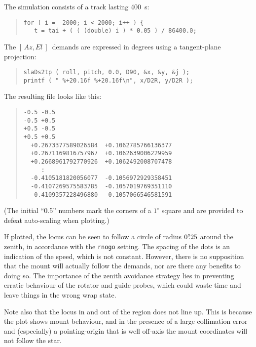\documentclass[12pt,fleqn,twoside]{article}
\renewcommand{\_}{{\tt\char'137}}     %
\newcommand{\azel}      {$[\,Az,El~]$}
\newcommand{\degree}[2] {$#1^{\circ}
                        \hspace{-0.35em}.\hspace{0.04em}#2$}
\begin{document}
The simulation consists of a track lasting 400~s:
\begin{quote}
\begin{small}
\begin{verbatim}
for ( i = -2000; i < 2000; i++ ) {
   t = tai + ( ( (double) i ) * 0.05 ) / 86400.0;
\end{verbatim}\end{small}
\end{quote}
The \azel\ demands are expressed in degrees using a tangent-plane
projection:
\begin{quote}
\begin{small}
\begin{verbatim}
slaDs2tp ( roll, pitch, 0.0, D90, &x, &y, &j );
printf ( " %+20.16f %+20.16f\n", x/D2R, y/D2R );
\end{verbatim}\end{small}
\end{quote}
The resulting file looks like this:
\begin{quote}
\begin{small}
\begin{verbatim}
-0.5 -0.5
-0.5 +0.5
+0.5 -0.5
+0.5 +0.5
  +0.2673377589026584  +0.1062785766136377
  +0.2671169816757967  +0.1062639006229959
  +0.2668961792770926  +0.1062492008707478
     :
  -0.4105181820056077  -0.1056972929358451
  -0.4107269575583785  -0.1057019769351110
  -0.4109357228496880  -0.1057066546581591
\end{verbatim}\end{small}
\end{quote}
(The initial ``0.5'' numbers mark the corners of a $1^\circ$
square and are provided to defeat auto-scaling when plotting.)

If plotted, the locus can
be seen to follow a circle of radius \degree{0}{25}
around the zenith, in accordance with the {\tt rnogo} setting.
The spacing
of the dots is an indication of the speed, which is not constant.
However, there is no supposition that the mount will actually follow the
demands, nor are there any benefits to doing so.  The importance of
the zenith avoidance strategy lies in preventing
erratic behaviour of the
rotator and guide probes, which could waste time and leave things in
the wrong wrap state.

Note also that the locus in and out of the region
does not line up.  This is because the plot shows mount behaviour, and
in the presence of a large collimation error and (especially) a
pointing-origin that is well off-axis the mount coordinates will
not follow the star.
\end{document}
